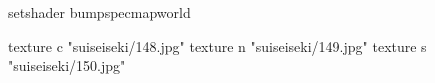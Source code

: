 setshader bumpspecmapworld

    texture c "suiseiseki/148.jpg"
    texture n "suiseiseki/149.jpg"
    texture s "suiseiseki/150.jpg"
